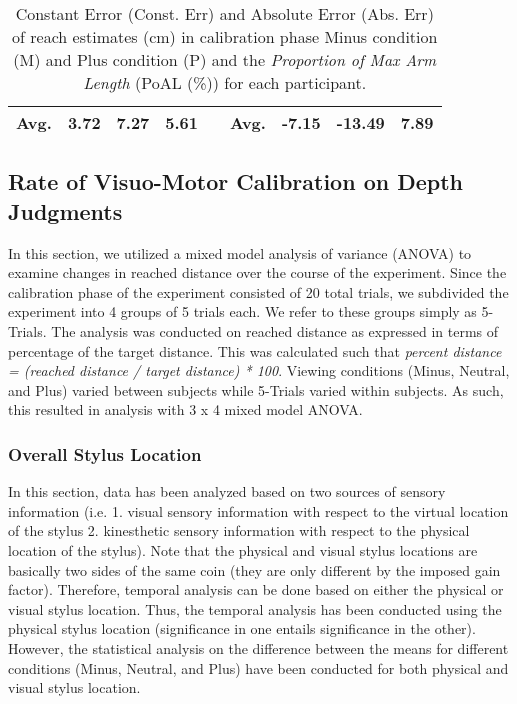 \begin{table*}[t]
\begin{center}
\begin{tabular}{|c|c|c|c|c|c|c|c|c|}
			\textbf{Avg.}  & \textbf{3.72}    & \textbf{7.27}     & \textbf{5.61}      & \textbf{} & \textbf{Avg.}  & \textbf{-7.15}   & \textbf{-13.49}    & \textbf{7.89}      \\ \hline
		\end{tabular}
		\caption{Constant Error (Const. Err) and Absolute Error (Abs. Err) of reach estimates (cm) in calibration phase Minus condition (M) and Plus condition (P) and the \textit{Proportion of Max Arm Length} (PoAL (\%)) for each participant.}\label{tb:tb2}
	\end{center}
\end{table*}


\subsection{Rate of Visuo-Motor Calibration on Depth Judgments}
In this section, we utilized a mixed model analysis of variance (ANOVA) to examine changes in reached distance over the course of the experiment. Since the calibration phase of the experiment consisted of 20 total trials, we subdivided the experiment into 4 groups of 5 trials each. We refer to these groups simply as 5-Trials. The analysis was conducted on reached distance as expressed in terms of percentage of the target distance. This was calculated such that \textit{percent distance = (reached distance / target distance) * 100}. Viewing conditions (Minus, Neutral, and Plus) varied between subjects while 5-Trials varied within subjects. As such, this resulted in analysis with 3 x 4 mixed model ANOVA.

\subsubsection{Overall Stylus Location}
In this section, data has been analyzed based on two sources of sensory information (i.e. 1. visual sensory information with respect to the virtual location of the stylus 2. kinesthetic sensory information with respect to the physical location of the stylus). Note that the physical and visual stylus locations are basically two sides of the same coin (they are only different by the imposed gain factor). Therefore, temporal analysis can be done based on either the physical or visual stylus location. Thus, the temporal analysis has been conducted using the physical stylus location (significance in one entails significance in the other). However, the statistical analysis on the difference between the means for different conditions (Minus, Neutral, and Plus) have been conducted for both physical and visual stylus location.

